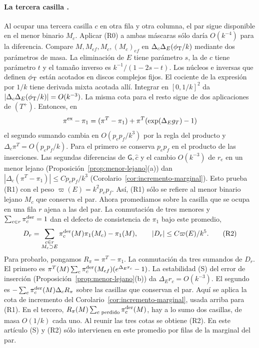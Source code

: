 \paragraph{La tercera casilla .}
Al ocupar una tercera casilla $c$ en otra fila y otra columna, el par sigue disponible en el
menor binario $M_c$. Aplicar (R0) a ambas máscaras sólo daría $O(k^{-4})$ para la diferencia.
Compare $M,M_{ef},M_c,(M_c)_{ef}$ en $\Delta_c\Delta_E(\phi_{\mathrm T}/k)$ mediante dos parámetros
de masa. La eliminación de $E$ tiene parámetro
$s$, la de $c$ tiene parámetro $t$ y el tamaño inverso es $k^{-1}/(1-2s-t)$.
Los núcleos e inversas que definen $\phi_{\mathrm T}$ están acotados en discos complejos fijos. El cociente
de la expresión por $1/k$ tiene derivada mixta acotada allí. Integrar en $[0,1/k]^2$
da $|\Delta_c\Delta_E(\phi_{\mathrm T}/k)|=O(k^{-3})$. La misma cota para el resto sigue de dos
aplicaciones de $(T^+)$. Entonces, en
\[
 \pi^{\rm ex}-\pi_1=(\pi^T-\pi_1)+\pi^T(\exp(\Delta_E g_T)-1)
\]
el segundo sumando cambia en $O(p_ep_f/k^3)$ por la regla del producto y
$\Delta_c\pi^T=O(p_ep_f/k)$. Para el primero se conserva $p_ep_f$ en el producto de las
inserciones. Las segundas diferencias de $\mathsf G,\hat c$ y el cambio $O(k^{-3})$ de $r_e$
en un menor lejano (Proposición~\ref{prop:menor-lejano}(a)) dan
$|\Delta_c(\pi^T-\pi_1)|\le Cp_ep_f/k^3$ (Corolario~\ref{cor:incremento-marginal}). Esto prueba (R1)
con el peso $\varpi(E)=k^2p_ep_f$. Así, (R1) sólo se refiere al menor binario lejano $M_c$ que conserva
el par. Ahora promediamos sobre la casilla que se ocupa en una fila $r$ ajena a
las del par. La conmutación de tres menores y $\sum_{c\in r}\pi^{\rm der}_c=1$ dan el defecto
de consistencia de $\pi_1$ bajo este promedio,
\[
  D_r=\sum_{\substack{c\in r\\ M_c\supset E}}\pi^{\rm der}_c(M)\pi_1(M_c)-\pi_1(M),
       \qquad |D_r|\le C\varpi(E)/k^5. \tag{R2}
\]
Para probarlo, pongamos $R_\pi=\pi^T-\pi_1$. La conmutación da tres sumandos de $D_r$.
El primero es $\pi^T(M)\sum_c\pi_c^{\rm der}(M_{ef})(e^{\Delta_E r_c}-1)$.
La estabilidad (S) del error de inserción (Proposición~\ref{prop:menor-lejano}(b)) da
$\Delta_E r_c=O(k^{-3})$.
El segundo es $-\sum_c\pi_c^{\rm der}(M)\Delta_cR_\pi$ sobre las casillas que conservan el par.
Aquí se aplica la cota de incremento del Corolario~\ref{cor:incremento-marginal}, usada arriba para
(R1). En el tercero,
$R_\pi(M)\sum_{c\text{ perdido}}\pi_c^{\rm der}(M)$, hay a lo sumo dos casillas,
de masa $O(1/k)$ cada uno. Al reunir las tres cotas se obtiene (R2). En este artículo (S) y (R2)
sólo intervienen en este promedio por filas de la marginal del par.

